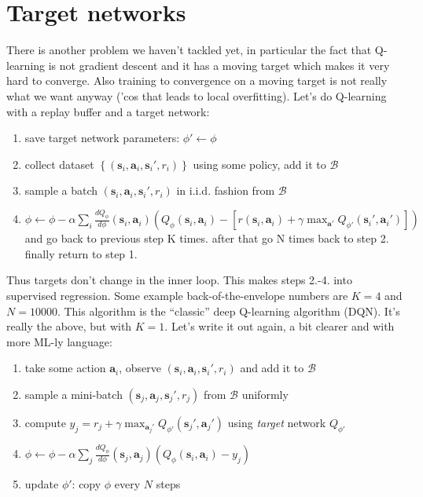 \documentclass{report}
\begin{document}
\section{Target networks}
There is another problem we haven't tackled yet,
in particular the fact that Q-learning is not gradient descent and it has a moving target 
which makes it very hard to converge.
Also training to convergence on a moving target is not really what we want anyway ('cos that leads to local overfitting).
Let's do Q-learning with a replay buffer and a target network:
\begin{enumerate}
		\item save target network parameters: $\phi' \leftarrow \phi$
		\item collect dataset $\left\{ \left( \bm{s}_i, \bm{a}_i, \bm{s}_i', r_i \right)  \right\} $ using some policy, add it to $\mathcal{B}$
		\item sample a batch  $\left( \bm{s}_i, \bm{a}_i, \bm{s}_i', r_i \right)$ in i.i.d. fashion from $\mathcal{B}$
		\item $  \phi \leftarrow \phi  - \alpha \sum_{i}^{}  \frac{d Q_\phi}{d\phi} (\bm{s}_{i}, \bm{a}_{i}) \left( Q_\phi(\bm{s}_{i}, \bm{a}_{i}) - 
				\left[ r(\bm{s}_{i}, \bm{a}_{i}) + \gamma \max_{\bm{a}'} Q_{\phi'} (\bm{s}_{i}', \bm{a}_{i}') \right] 	\right) $ 
				and go back to previous step K times. after that go N times back to step 2. finally return to step 1.
\end{enumerate}
Thus targets don't change in the inner loop. This makes steps 2.-4. into supervised regression.
Some example back-of-the-envelope numbers are $K=4$ and $N=10000$.
This algorithm is the ``classic'' deep Q-learning algorithm (DQN).
It's really the above, but with $K=1$.
Let's write it out again, a bit clearer and with more ML-ly language:
\begin{enumerate}
		\item take some action $\bm{a}_i$,  observe $\left( \bm{s}_i, \bm{a}_i, \bm{s}_i', r_i \right)$ and add it to $\mathcal{B}$
		\item sample a mini-batch  $\left( \bm{s}_j, \bm{a}_j, \bm{s}_j', r_j \right)$  from $\mathcal{B}$ uniformly
		\item compute $y_j = r_j + \gamma \max_{\bm{a}_j'} Q_{\phi'} (\bm{s}_{j}', \bm{a}_{j}')$ using \textit{target} network $Q_{\phi'}$
		\item $  \phi \leftarrow \phi  - \alpha \sum_{j}^{}  \frac{d Q_\phi}{d\phi} (\bm{s}_{j}, \bm{a}_{j}) \left( Q_\phi(\bm{s}_{i}, \bm{a}_{i}) - 
				y_j 	\right) $ 
		\item update $\phi'$: copy $\phi$ every $N$ steps
\end{enumerate}
\end{document}
